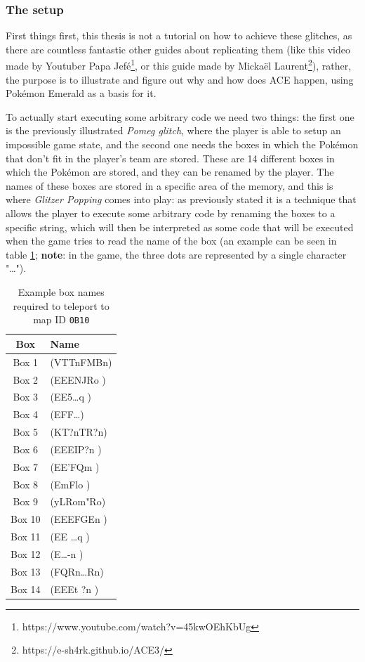 \documentclass[a4paper]{usiinfbachelorproject}
\begin{document}
\subsubsection{The setup}
\label{sec:setup}
First things first, this thesis is not a tutorial on how to achieve these glitches, as there are countless fantastic other guides about replicating them (like this video made by Youtuber Papa Jefé\footnote{https://www.youtube.com/watch?v=45kwOEhKbUg}, or this guide made by Mickaël Laurent\footnote{https://e-sh4rk.github.io/ACE3/}), rather, the purpose is to illustrate and figure out why and how does ACE happen, using Pokémon Emerald as a basis for it.

To actually start executing some arbitrary code we need two things: the first one is the previously illustrated \textit{Pomeg glitch}, where the player is able to setup an impossible game state, and the second one needs the boxes in which the Pokémon that don't fit in the player's team are stored. These are 14 different boxes in which the Pokémon are stored, and they can be renamed by the player. The names of these boxes are stored in a specific area of the memory, and this is where \textit{Glitzer Popping} comes into play: as previously stated it is a technique that allows the player to execute some arbitrary code by renaming the boxes to a specific string, which will then be interpreted as some code that will be executed when the game tries to read the name of the box (an example can be seen in table \ref{tab:boxes_names}; \textbf{note}: in the game, the three dots are represented by a single character "\dots").

\begin{table}[h!]
	\centering
	\begin{tabular}{|c|l|}
		\hline
		\textbf{Box} & \textbf{Name}  \\
		\hline
		Box 1        & (VTTnFMBn)     \\
		Box 2        & (EEENJRo )     \\
		Box 3        & (EE5\dots q  ) \\
		Box 4        & (EFF\dots    ) \\
		Box 5        & (KT?nTR?n)     \\
		Box 6        & (EEEIP?n )     \\
		Box 7        & (EE'FQm  )     \\
		Box 8        & (EmFlo   )     \\
		Box 9        & (yLRom"Ro)     \\
		Box 10       & (EEEFGEn )     \\
		Box 11       & (EE \dots q  ) \\
		Box 12       & (E\dots -n   ) \\
		Box 13       & (FQRn\dots Rn) \\
		Box 14       & (EEEt ?n )     \\
		\hline
	\end{tabular}
	\caption{Example box names required to teleport to map ID \texttt{0B10}}
	\label{tab:boxes_names}
\end{table}
\end{document}
